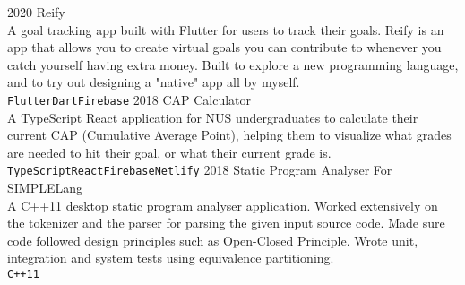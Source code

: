 \documentclass[9pt]{developercv} %
\begin{document}
\begin{entrylist}
	\entry
		{2020}
		{Reify\smallskip}{}
		{
			\smallskip
			\hspace{1cm}
			 \\
			A goal tracking app built with Flutter for users to track their goals.
			Reify is an app that allows you to create virtual goals you can contribute to whenever you catch yourself having extra money. 
      Built to explore a new programming language, and to try out designing a "native" app all by myself.
			\\ \texttt{Flutter}\slashsep\texttt{Dart}\slashsep\texttt{Firebase}
		}
	\entry
		{2018}
		{CAP Calculator\smallskip}{}
		{
			\smallskip
			\hspace{1cm}
			 \\
			A TypeScript React application for NUS undergraduates to calculate their current CAP (Cumulative Average Point), helping them
		to visualize what grades are needed to hit their goal, or what their current grade is.
		\\ \texttt{TypeScript}\slashsep\texttt{React}\slashsep\texttt{Firebase}\slashsep\texttt{Netlify}
		}
	\entry
		{2018}
		{Static Program Analyser For SIMPLELang\smallskip}{}
		{
			\smallskip
			 \\
			A C++11 desktop static program analyser application. Worked extensively on the tokenizer and the parser for parsing the given 
			input source code. Made sure code followed design principles such as Open-Closed Principle. Wrote unit, integration and system tests using equivalence partitioning.
		\\ \texttt{C++11}
		}
\end{entrylist}


	
	
\end{document}
